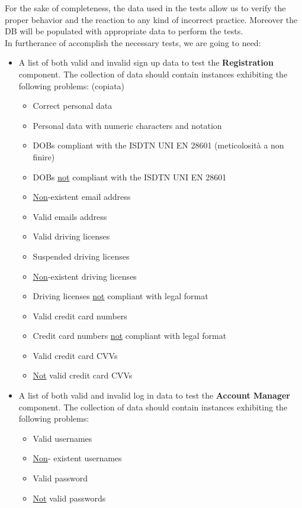 \documentclass[english]{article}
\begin{document}
 For the sake of completeness, the data used in the tests allow us to verify the proper behavior and the reaction to any kind of incorrect practice. Moreover the DB will be populated with appropriate data to perform the tests.\\
 In furtherance of accomplish the necessary tests, we are going to need:
 
 \begin{itemize}
   \item{A list of both valid and invalid sign up data to test the \textbf{Registration} component.
   The collection of data should contain instances exhibiting the following problems: (copiata)
     \begin{itemize}
       \item{Correct personal data}
       \item{Personal data with numeric characters and notation}
       \item{DOBs compliant with the ISDTN UNI EN 28601} (meticolosità a non finire)
       \item{DOBs \underline{not} compliant with the ISDTN UNI EN 28601}
       \item{\underline{Non}-existent email address}
       \item{Valid emails address}
       \item{Valid driving licenses}
       \item{Suspended driving licenses}
       \item{\underline{Non}-existent driving licenses}
       \item{Driving licenses \underline{not} compliant with legal format}
       \item{Valid credit card numbers}
       \item{Credit card numbers \underline{not} compliant with legal format}
       \item{Valid credit card CVVs}
       \item{\underline{Not} valid credit card CVVs}
     \end{itemize}}
 
     \item{A list of both valid and invalid log in data to test the \textbf{Account Manager} component.
     The collection of data should contain instances exhibiting the following problems:
     \begin{itemize}
       \item{Valid usernames}
       \item{\underline{Non}- existent usernames}
       \item{Valid password}
       \item{\underline{Not} valid passwords}
     \end{itemize}}
 

\end{itemize}
\end{document}
